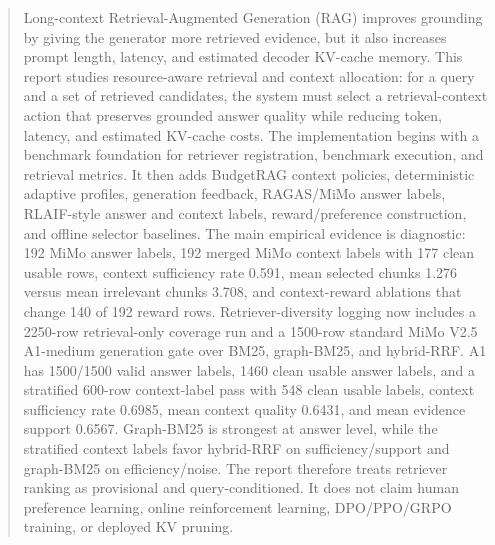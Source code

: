 \begin{abstract}
Long-context Retrieval-Augmented Generation (RAG) improves grounding by giving the generator more retrieved evidence, but it also increases prompt length, latency, and estimated decoder KV-cache memory. This report studies resource-aware retrieval and context allocation: for a query and a set of retrieved candidates, the system must select a retrieval-context action that preserves grounded answer quality while reducing token, latency, and estimated KV-cache costs. The implementation begins with a benchmark foundation for retriever registration, benchmark execution, and retrieval metrics. It then adds BudgetRAG context policies, deterministic adaptive profiles, generation feedback, RAGAS/MiMo answer labels, RLAIF-style answer and context labels, reward/preference construction, and offline selector baselines. The main empirical evidence is diagnostic: 192 MiMo answer labels, 192 merged MiMo context labels with 177 clean usable rows, context sufficiency rate 0.591, mean selected chunks 1.276 versus mean irrelevant chunks 3.708, and context-reward ablations that change 140 of 192 reward rows. Retriever-diversity logging now includes a 2250-row retrieval-only coverage run and a 1500-row standard MiMo V2.5 A1-medium generation gate over BM25, graph-BM25, and hybrid-RRF. A1 has 1500/1500 valid answer labels, 1460 clean usable answer labels, and a stratified 600-row context-label pass with 548 clean usable labels, context sufficiency rate 0.6985, mean context quality 0.6431, and mean evidence support 0.6567. Graph-BM25 is strongest at answer level, while the stratified context labels favor hybrid-RRF on sufficiency/support and graph-BM25 on efficiency/noise. The report therefore treats retriever ranking as provisional and query-conditioned. It does not claim human preference learning, online reinforcement learning, DPO/PPO/GRPO training, or deployed KV pruning.
\end{abstract}
\newpage
